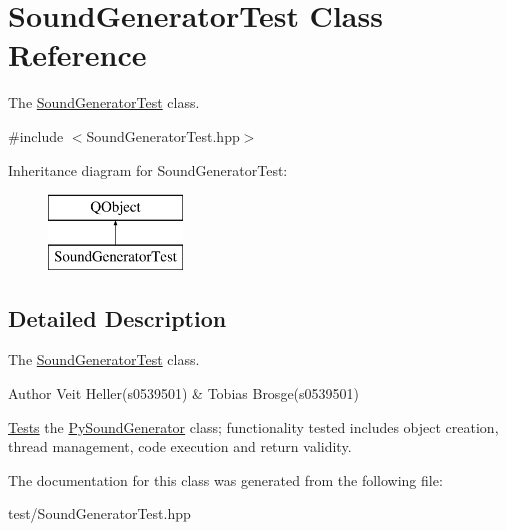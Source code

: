 \hypertarget{classSoundGeneratorTest}{\section{Sound\+Generator\+Test Class Reference}
\label{classSoundGeneratorTest}
}


The \hyperlink{classSoundGeneratorTest}{Sound\+Generator\+Test} class.  




{\ttfamily \#include $<$Sound\+Generator\+Test.\+hpp$>$}

Inheritance diagram for Sound\+Generator\+Test\+:\begin{figure}[H]
\begin{center}
\leavevmode
\includegraphics[height=2.000000cm]{classSoundGeneratorTest}
\end{center}
\end{figure}


\subsection{Detailed Description}
The \hyperlink{classSoundGeneratorTest}{Sound\+Generator\+Test} class. 

\begin{DoxyAuthor}{Author}
Veit Heller(s0539501) \& Tobias Brosge(s0539501)
\end{DoxyAuthor}
\hyperlink{structTests}{Tests} the \hyperlink{classPySoundGenerator}{Py\+Sound\+Generator} class; functionality tested includes object creation, thread management, code execution and return validity. 

The documentation for this class was generated from the following file\+:\begin{DoxyCompactItemize}
\item 
test/Sound\+Generator\+Test.\+hpp\end{DoxyCompactItemize}
